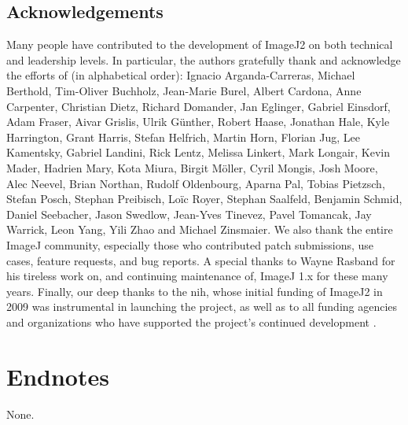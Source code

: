 \documentclass{bmcart}
\begin{document}
\begin{backmatter}
\subsection*{Acknowledgements}
  Many people have contributed to the development of ImageJ2 on both technical
  and leadership levels. In particular, the authors gratefully thank and
  acknowledge the efforts of (in alphabetical order): Ignacio Arganda-Carreras,
  Michael Berthold, Tim-Oliver Buchholz, Jean-Marie Burel, Albert Cardona, Anne
  Carpenter, Christian Dietz, Richard Domander, Jan Eglinger, Gabriel Einsdorf,
  Adam Fraser, Aivar Grislis, Ulrik Günther, Robert Haase, Jonathan Hale, Kyle
  Harrington, Grant Harris, Stefan Helfrich, Martin Horn, Florian Jug, Lee
  Kamentsky, Gabriel Landini, Rick Lentz, Melissa Linkert, Mark Longair, Kevin
  Mader, Hadrien Mary, Kota Miura, Birgit Möller, Cyril Mongis, Josh Moore,
  Alec Neevel, Brian Northan, Rudolf Oldenbourg, Aparna Pal, Tobias Pietzsch,
  Stefan Posch, Stephan Preibisch, Loïc Royer, Stephan Saalfeld, Benjamin
  Schmid, Daniel Seebacher, Jason Swedlow, Jean-Yves Tinevez, Pavel Tomancak,
  Jay Warrick, Leon Yang, Yili Zhao and Michael Zinsmaier. We also thank the
  entire ImageJ community, especially those who contributed patch submissions,
  use cases, feature requests, and bug reports. A special thanks to Wayne
  Rasband for his tireless work on, and continuing maintenance of, ImageJ 1.x
  for these many years. Finally, our deep thanks to the \acrshort{nih}, whose
  initial funding of ImageJ2 in 2009 was instrumental in launching the project,
  as well as to all funding agencies and organizations who have supported the
  project's continued development \cite{imagej_funding}.

\section*{Endnotes}
  None.



\end{backmatter}
\end{document}
